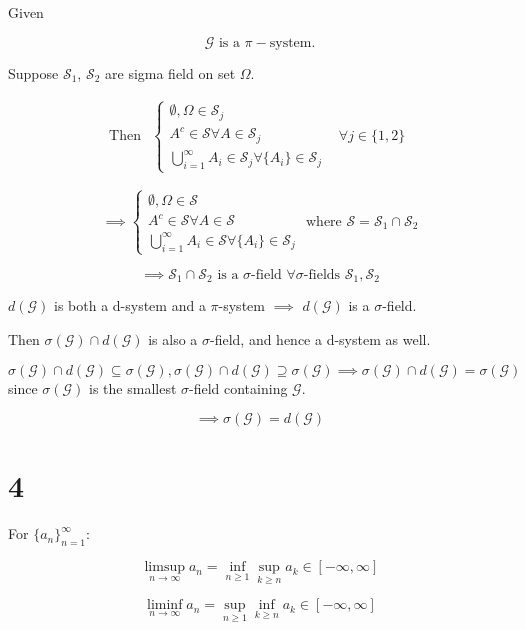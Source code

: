 Given

$$
\mathcal{G}\text{ is a }\pi-\text{system.}
$$

Suppose $\mathcal{S}_1$, $\mathcal{S}_2$ are sigma field on set $\Omega$.

$$\text{Then }\begin{array}{lr}
\left\{
\begin{array}{l}
\emptyset,\Omega\in\mathcal{S}_j
\\
 A^c\in\mathcal{S}\forall A\in\mathcal{S}_j
\\
\bigcup_{i=1}^{\infty} A_i\in\mathcal{S}_j\forall \{A_i\}\in\mathcal{S}_j
\end{array}\right.
&\forall j\in\{1,2\}
\end{array}
$$

$$
\implies \left\{
\begin{array}{l}
\emptyset,\Omega\in\mathcal{S}
\\
 A^c\in\mathcal{S}\forall A\in\mathcal{S}
\\
\bigcup_{i=1}^{\infty} A_i\in\mathcal{S}\forall \{A_i\}\in\mathcal{S}_j
\end{array}\right.
\text{ where }\mathcal{S}=\mathcal{S}_1\cap\mathcal{S}_2
$$ 

$$
\implies
\mathcal{S}_1\cap \mathcal{S}_2
\text{ is a }\sigma\text{-field }\forall \sigma\text{-fields }\mathcal{S}_1,\mathcal{S}_2
$$

$d(\mathcal{G})$ is both a d-system and a $\pi$-system $\implies$ $d(\mathcal{G})$ is a $\sigma$-field.

Then $\sigma(\mathcal{G})\cap d(\mathcal{G})$ is also a $\sigma$-field, and hence a d-system as well.

$\sigma(\mathcal{G})\cap d(\mathcal{G})\subseteq\sigma(\mathcal{G}), \sigma(\mathcal{G})\cap d(\mathcal{G})\supseteq\sigma(\mathcal{G}) \implies \sigma(\mathcal{G})\cap d(\mathcal{G})=\sigma(\mathcal{G})$ since $\sigma(\mathcal{G})$ is the smallest $\sigma$-field containing $\mathcal{G}$.

$$
\implies 
\sigma(\mathcal{G})= d(\mathcal{G})
$$

\bigskip
\section*{4}

For $\{a_n\}_{n=1}^{\infty}$:

$$
\limsup_{n\rightarrow\infty} a_n=
\inf_{n\geq 1} \sup_{k\geq n}a_k\in[-\infty,\infty]
$$

$$
\liminf_{n\rightarrow\infty}a_n=
\sup_{n\geq 1}\inf_{k\geq n}a_k\in[-\infty,\infty]
$$


